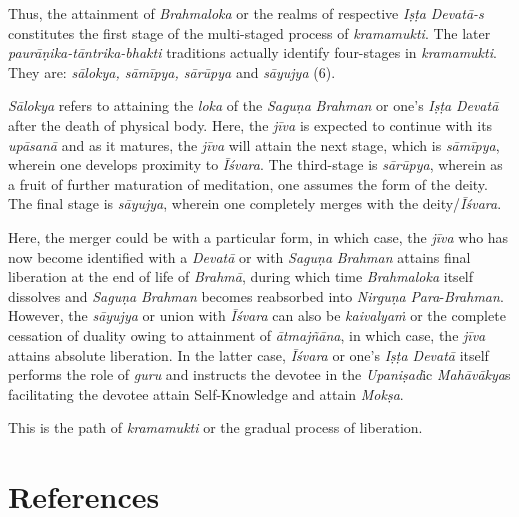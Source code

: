 Thus, the attainment of \emph{Brahmaloka} or the realms of respective \emph{Iṣṭa} \emph{Devatā-s} constitutes the first stage of the multi-staged process of \emph{kramamukti}. The later \emph{paurāṇika-tāntrika-bhakti} traditions actually identify four-stages in \emph{kramamukti}. They are: \emph{sālokya, sāmīpya, sārūpya} and \emph{sāyujya} (6).

\emph{Sālokya} refers to attaining the \emph{loka} of the \emph{Saguṇa} \emph{Brahman} or one's \emph{Iṣṭa} \emph{Devatā} after the death of physical body. Here, the \emph{jīva} is expected to continue with its \emph{upāsanā} and as it matures, the \emph{jīva} will attain the next stage, which is \emph{sāmīpya}, wherein one develops proximity to \emph{Īśvara}. The third-stage is \emph{sārūpya}, wherein as a fruit of further maturation of meditation, one assumes the form of the deity. The final stage is \emph{sāyujya}, wherein one completely merges with the deity/\emph{Īśvara}.

Here, the merger could be with a particular form, in which case, the \emph{jīva} who has now become identified with a \emph{Devatā} or with \emph{Saguṇa} \emph{Brahman} attains final liberation at the end of life of \emph{Brahmā}, during which time \emph{Brahmaloka} itself dissolves and \emph{Saguṇa} \emph{Brahman} becomes reabsorbed into \emph{Nirguṇa} \emph{Para}-\emph{Brahman}. However, the \emph{sāyujya} or union with \emph{Īśvara} can also be \emph{kaivalyaṁ} or the complete cessation of duality owing to attainment of \emph{ātmajñāna}, in which case, the \emph{jīva} attains absolute liberation. In the latter case, \emph{Īśvara} or one's \emph{Iṣṭa Devatā} itself performs the role of \emph{guru} and instructs the devotee in the \emph{Upaniṣad}ic \emph{Mahāvākya}s facilitating the devotee attain Self-Knowledge and attain \emph{Mokṣa}.

This is the path of \emph{kramamukti} or the gradual process of liberation.

\section*{References}

